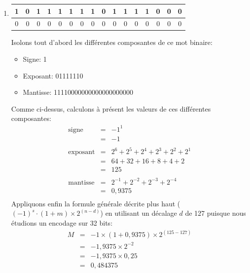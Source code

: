 \documentclass[12pt]{article}
\newenvironment{MaReponse}
		{\begin{greyedtextbox}\itshape} %
		{\end{greyedtextbox}}            %
\newenvironment{alphenum}
{\begin{enumerate}[label=\alph*.]}
	{\end{enumerate}}
\begin{document}
\begin{MaReponse}
\begin{alphenum}
			\item
			\begin{tabular}{|c|c|c|c|c|c|c|c|c|c|c|c|c|c|c|c|} %
				\hline
				1&0&1&1&1&1&1&1&0&1&1&1&1&0&0&0 \\
				\hline
				0&0&0&0&0&0&0&0&0&0&0&0&0&0&0&0 \\
				\hline
			\end{tabular}
			\par
			Isolons tout d'abord les différentes composantes de ce mot binaire:
			\begin{itemize}
				\item Signe: 1
				\item Exposant: 01111110
				\item Mantisse: 11110000000000000000000
			\end{itemize}
			Comme ci-dessus, calculons à présent les valeurs de ces différentes composantes:
			\[
			\begin{array}{lll}
				\text{signe} & \text{=} & -1^1\\
				& \text{=} & -1\\
				\\
				\text{exposant} & \text{=} & 2^6 + 2^5 + 2^4 + 2^3 + 2^2 + 2^1 \\
				& \text{=} & 64 + 32 + 16 + 8 + 4 + 2\\
				& \text{=} & 125\\
				\\
				\text{mantisse} & \text{=} & 2^{-1} + 2^{-2} + 2^{-3} + 2^{-4}\\
				& \text{=} & 0,9375\\
			\end{array}
			\]
			Appliquons enfin la formule générale décrite plus haut ($(-1)^s\cdot (1+m) \times 2^{(n-d)}$) en utilisant un décalage $d$ de 127 puisque nous étudions un encodage sur 32 bits:
			\[
			\begin{array}{lll}
				M& \text{=} & -1 \times (1+0,9375) \times 2^{(125 - 127)}\\
				& \text{=} & -1,9375 \times 2^{-2}\\
				& \text{=} & -1,9375 \times 0,25\\
				& \text{=} & 0,484375\
			\end{array}
			\]
		\end{alphenum}
	\end{MaReponse}
	
\end{document}
